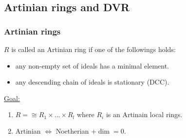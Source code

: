 \subsection{Artinian rings and DVR}
\subsubsection{Artinian rings}

\begin{definition}
  $R$ is called an Artinian ring if one of the followings holds:
  \begin{itemize}
    \item any non-empty set of ideals has a minimal element.
    \item any descending chain of ideals is stationary (DCC).
  \end{itemize}
\end{definition}


\underline{Goal:}
\begin{enumerate}
  \item $R = \cong R_1 \times \dots \times R_l$ where $R_i$ is an Artinain
    local rings.
  \item Artinian $\iff$ Noetherian $+ \dim = 0$.
\end{enumerate}

